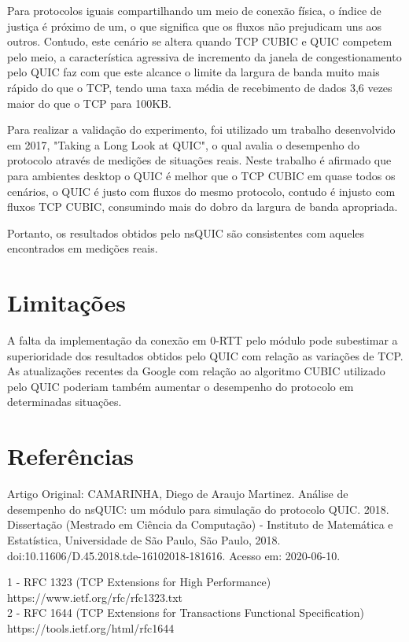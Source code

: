 \documentclass{article}
\begin{document}
Para protocolos iguais compartilhando um meio de conexão física, o índice de justiça é próximo de um, o que significa
que os fluxos não prejudicam uns aos outros. Contudo, este cenário se altera quando TCP CUBIC e QUIC competem pelo
meio, a característica agressiva de incremento da janela de congestionamento pelo QUIC faz com que este alcance o limite
da largura de banda muito mais rápido do que o TCP, tendo uma taxa média de recebimento de dados 3,6 vezes maior do que
o TCP para 100KB.

Para realizar a validação do experimento, foi utilizado um trabalho desenvolvido em 2017, "Taking a Long Look at QUIC",
o qual avalia o desempenho do protocolo através de medições de situações reais. Neste trabalho é afirmado que para
ambientes desktop o QUIC é melhor que o TCP CUBIC em quase todos os cenários, o QUIC é justo com fluxos do mesmo
protocolo, contudo é injusto com fluxos TCP CUBIC, consumindo mais do dobro da largura de banda apropriada.

Portanto, os resultados obtidos pelo nsQUIC são consistentes com aqueles encontrados em medições reais.

\section{Limitações}
A falta da implementação da conexão em 0-RTT pelo módulo pode subestimar a superioridade dos resultados obtidos pelo
QUIC com relação as variações de TCP. As atualizações recentes da Google com relação ao algoritmo CUBIC utilizado pelo QUIC
poderiam também aumentar o desempenho do protocolo em determinadas situações.


\section{Referências}
Artigo Original: CAMARINHA, Diego de Araujo Martinez. Análise de desempenho do nsQUIC: um módulo para simulação do
protocolo QUIC. 2018. Dissertação (Mestrado em Ciência da Computação) - Instituto de Matemática e Estatística,
Universidade de São Paulo, São Paulo, 2018. doi:10.11606/D.45.2018.tde-16102018-181616. Acesso em: 2020-06-10.

1 - RFC 1323 (TCP Extensions for High Performance) https://www.ietf.org/rfc/rfc1323.txt \\

2 - RFC 1644 (TCP Extensions for Transactions Functional Specification) https://tools.ietf.org/html/rfc1644 \\
\end{document}
